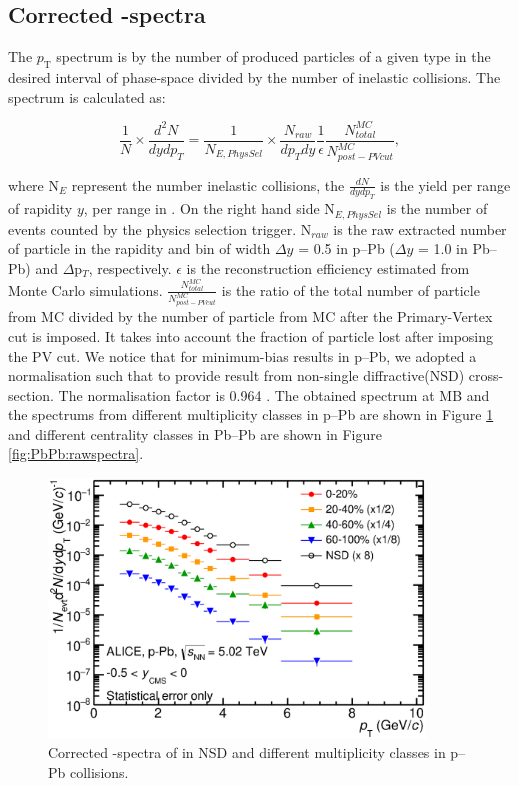 \newpage
\subsection{Corrected \pt-spectra}\label{sec:pPb:spectra} 

The $p_{\mathrm{T}}$ spectrum is by the number of produced particles of a given type in the desired interval of phase-space divided by the number of inelastic collisions. The spectrum is calculated as:

\begin{equation}
\frac{1}{N} \times \frac{d^{2}N}{dydp_{T}} = \frac{1}{N_{E,PhysSel}} \times \frac{N_{raw}}{dp_{T}dy}  \frac{1}{\epsilon} \frac{N_{total}^{MC}}{N_{post-PV cut}^{MC}}   ,
\end{equation}

where N$_{E}$ represent the number inelastic collisions, the $\frac{dN}{dydp_{T}}$ is the yield  per range of rapidity $y$, per range in \pt. On the right hand side N$_{E,PhysSel}$ is the number of events counted by the physics selection trigger. N$_{raw}$ is the raw extracted number of particle in the rapidity and \pt bin of width $\Delta y$ = 0.5 in p--Pb ($\Delta y$ = 1.0 in Pb--Pb) and $\Delta$p$_{T}$, respectively. $\epsilon$ is the reconstruction efficiency estimated from Monte Carlo simulations. $\frac{N_{total}^{MC}}{N_{post-PV cut}^{MC}}$ is the ratio of the total number of particle from MC divided by the number of particle from MC after the Primary-Vertex cut is imposed. It takes into account the fraction of particle lost after imposing the PV cut. We notice that for minimum-bias results in p--Pb, we adopted a normalisation such that to provide result from non-single diffractive(NSD) cross-section. The normalisation factor is 0.964 \cite{cite:KphipPb}. The obtained spectrum at MB and the spectrums from different multiplicity classes in p--Pb are shown in Figure \ref{fig:pPb:rawspectra} and different centrality classes in Pb--Pb are shown in Figure \ref{fig:PbPb:rawspectra}.

\begin{figure}[htbp]
\begin{center}
\includegraphics[width=10.0cm]{./Version1/FigChapter5/Spectra/StatSpectrapPb.eps}
\caption{Corrected \pt-spectra of \xis in NSD and different multiplicity classes in p--Pb collisions.} 
 \label{fig:pPb:rawspectra}
\end{center}
\end{figure}

